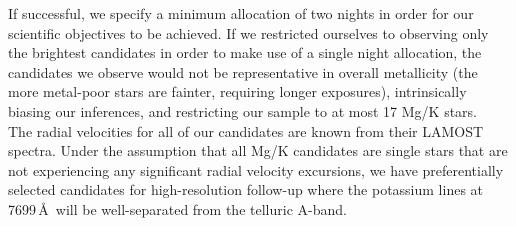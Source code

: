 \documentclass{article}
\begin{document}
\begin{technicalinfo}
If successful,  we specify a minimum allocation of two nights in order for our scientific objectives to be achieved. If we restricted ourselves to observing only the brightest candidates in order to make use of a single night allocation, the candidates we observe would not be representative in overall metallicity (the more metal-poor stars are fainter, requiring longer exposures), intrinsically biasing our inferences, and restricting our sample to at most 17 Mg/K stars.\\


The radial velocities for all of our candidates are known from their LAMOST spectra. Under the assumption that all Mg/K candidates are single stars that are not experiencing any significant radial velocity excursions, we have preferentially selected candidates for high-resolution follow-up where the potassium lines at 7699\,\AA\ will be well-separated from the telluric A-band.
\end{technicalinfo}



\begin{smoka}
\smokacheck
\end{smoka} 





\end{document}

